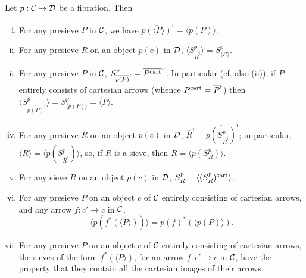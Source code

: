 \documentclass[a4paper,12pt]{article}
\begin{document}
\begin{lemma}\label{lemmafibrations}
	Let $p:{\cal C}\to {\cal D}$ be a fibration. Then
	\begin{enumerate}[(i)]
		\item For any presieve $P$  in $\cal C$, we have $\overline{p(\langle P\rangle )}^{i}=\langle p(P)\rangle $. 
		
		\item For any presieve $R$ on an object $p(c)$ in $\cal D$, $\langle S^{p}_{\overline{R}^{i}}\rangle =S^{p}_{\langle R\rangle }$. 
		
		\item For any presieve $P$ in $\cal C$, $S^{p}_{\overline{p(P)}^{i}}=\overline{P^{\textup{cart}}}^{v}$. In particular (cf. also (ii)), if $P$ entirely consists of cartesian arrows (whence $P^{\textup{cart}}=\overline{P}^{i}$) then $\langle S^{p}_{\overline{p(P)}^{i}}\rangle =S^{p}_{\langle p(P)\rangle }=\langle P\rangle $. 
		
		\item For any presieve $R$ on an object $p(c)$ in $\cal D$, $\overline{R}^{i}=\overline{p(S^{p}_{\overline{R}^{i}})}^{i}$; in particular, $\langle R\rangle =\langle p(S^{p}_{\overline{R}^{i}})\rangle $, so, if $R$ is a sieve, then $R=\langle p(S^{p}_{R})\rangle $. 
		
		\item For any sieve $R$ on an object $p(c)$ in $\cal D$, $S^{p}_{R}=\langle (S^{p}_{R})^{\textup{cart}}\rangle $.
		
		\item For any presieve $P$ on an object $c$ of $\cal C$ entirely consisting of cartesian arrows, and any arrow $f:c'\to c$ in $\cal C$, 
		\[
		\langle p(f^{\ast}(\langle P\rangle ))\rangle =p(f)^{\ast}(\langle p(P)\rangle ).
		\] 
		
		\item For any presieve $P$ on an object $c$ of $\cal C$ entirely consisting of cartesian arrows, the sieves of the form $f^{\ast}(\langle P\rangle )$, for an arrow $f:c'\to c$ in $\cal C$, have the property that they contain all the cartesian images of their arrows.
	\end{enumerate}	
\end{lemma}
\end{document}
